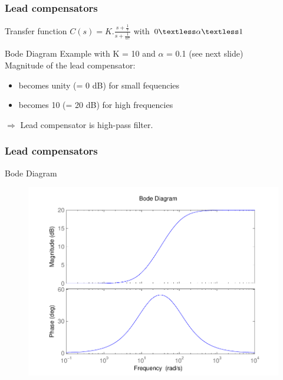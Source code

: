 \begin{frame}
\frametitle{Lead compensators}
	\begin{block}{Transfer function}
		$C(s) = K.\frac{s + \frac{1}{\tau}}{s + \frac{1}{\alpha\tau}}$ with $0 \textless  \alpha  \textless  1$
	\end{block}
	\begin{block}{Bode Diagram}
		Example with K = 10 and $\alpha$ = 0.1 (see next slide) \\
		Magnitude of the lead compensator:
		\begin{itemize}
			\item becomes unity (= 0 dB) for small fequencies
			\item becomes 10 (= 20 dB) for high frequencies
		\end{itemize}
		$\Rightarrow$ Lead compensator is high-pass filter.
	\end{block}
\end{frame}

\begin{frame}
\frametitle{Lead compensators}
\begin{block}{Bode Diagram}
\begin{figure}
	\centering
	\includegraphics[width=0.7
	\linewidth]{bodeleadfilter2}
\end{figure}
\end{block}
\end{frame}

